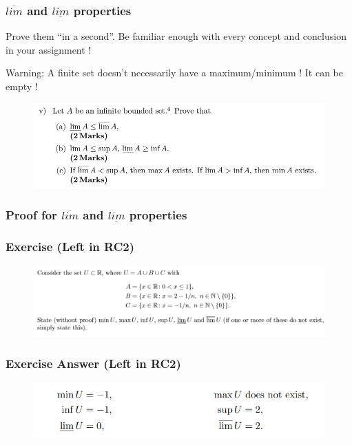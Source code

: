 \documentclass{beamer}
\begin{document}
\begin{frame}
    \frametitle{$\overline{lim}$ and $\underline{lim}$ properties}
    Prove them “in a second”. Be familiar enough with every concept and conclusion in your assignment !

    Warning: A finite set doesn't necessarily have a maximum/minimum ! It can be empty !

    \begin{figure}[htbp]
        \centering
        \includegraphics[width=12cm]{properties.png}
    \end{figure}
\end{frame}

\begin{frame}
    \frametitle{Proof for $\overline{lim}$ and $\underline{lim}$ properties}
\end{frame}

\begin{frame}
    \frametitle{Exercise (Left in RC2)}
    \begin{figure}[htbp]
        \centering
        \includegraphics[width=12cm]{extra2.png}
    \end{figure}
\end{frame}

\begin{frame}
    \frametitle{Exercise Answer (Left in RC2)}
    \begin{figure}[htbp]
        \centering
        \includegraphics[width=12cm]{answer.png}
    \end{figure}
\end{frame}
\end{document}
